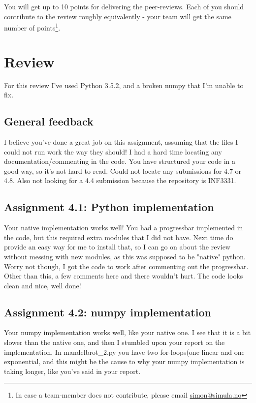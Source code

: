 \documentclass[a4paper]{article}
\begin{document}
You will get up to 10 points for delivering the peer-reviews. Each of you should contribute to the review roughly equivalently - your team will get the same number of points\footnote{In case a team-member does not contribute, please email \href{mailto:simon@simula.no}{simon@simula.no}}. 





\section{Review }\label{sec:review}

For this review I've used Python 3.5.2, and a broken numpy that I'm unable to fix.

\subsection*{General feedback}
I believe you've done a great job on this assignment, assuming that the files I could not run work the way they should! I had a hard time locating any documentation/commenting in the code. 
You have structured your code in a good way, so it's not hard to read. Could not locate any submissions for 4.7 or 4.8. Also not looking for a 4.4 submission because the repository is INF3331.

\subsection*{Assignment 4.1: Python implementation}
Your native implementation works well! You had a progressbar implemented in the code, but this required extra modules that I did not have. Next time do provide an easy way for me to install that, so I can go on about the review without messing with new modules, as this was supposed to be "native" python. 
Worry not though, I got the code to work after commenting out the progressbar. Other than this, a few comments here and there wouldn't hurt. The code looks clean and nice, well done! 


\subsection*{Assignment 4.2:  numpy implementation} \label{sec:assignment5.2}
Your numpy implementation works well, like your native one. I see that it is a bit slower than the native one, and then I stumbled upon your report on the implementation.
In mandelbrot\_2.py you have two for-loops(one linear and one exponential, and this might be the cause to why your numpy implementation is taking longer, like you've said in your report. 
\end{document}
